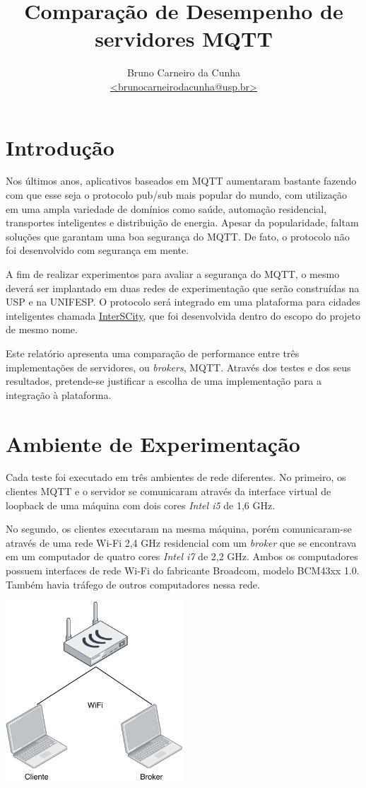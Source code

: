 \documentclass[12pt,a4paper]{article}
\title{Comparação de Desempenho de servidores MQTT}
\author{Bruno Carneiro da Cunha \\ \href{mailto:brunocarneirodacunha@usp.br}{<brunocarneirodacunha@usp.br>}}
\begin{document}
\maketitle
    
\section{Introdução}
Nos últimos anos, aplicativos baseados em MQTT aumentaram bastante fazendo com que esse seja o protocolo pub/sub mais popular do mundo, com utilização em uma ampla variedade de domínios como saúde, automação residencial, transportes inteligentes e distribuição de energia. Apesar da popularidade, faltam soluções que garantam uma boa segurança do MQTT. De fato, o protocolo não foi desenvolvido com segurança em mente.

A fim de realizar experimentos para avaliar a segurança do MQTT, o mesmo deverá ser implantado em duas redes de experimentação que serão construídas na USP e na UNIFESP. O protocolo será integrado em uma plataforma para cidades inteligentes chamada \href{https://interscity.org/}{InterSCity}, que foi desenvolvida dentro do escopo do projeto de mesmo nome.

Este relatório apresenta uma comparação de performance entre três implementações de servidores, ou \textit{brokers}, MQTT. Através dos testes e dos seus resultados, pretende-se justificar a escolha de uma implementação para a integração à plataforma.

\section{Ambiente de Experimentação}

Cada teste foi executado em três ambientes de rede diferentes. No primeiro, os clientes MQTT e o servidor se comunicaram através da interface virtual de loopback de uma máquina com dois cores \textit{Intel i5} de 1,6 GHz.

No segundo, os clientes executaram na mesma máquina, porém comunicaram-se através de uma rede Wi-Fi 2,4 GHz residencial com um \textit{broker} que se encontrava em um computador de quatro cores \textit{Intel i7} de 2,2 GHz. Ambos os computadores possuem interfaces de rede Wi-Fi do fabricante Broadcom, modelo BCM43xx 1.0. Também havia tráfego de outros computadores nessa rede.
\begin{center}
\includegraphics[width=0.5\textwidth]{wifi}
\end{center}
\end{document}
